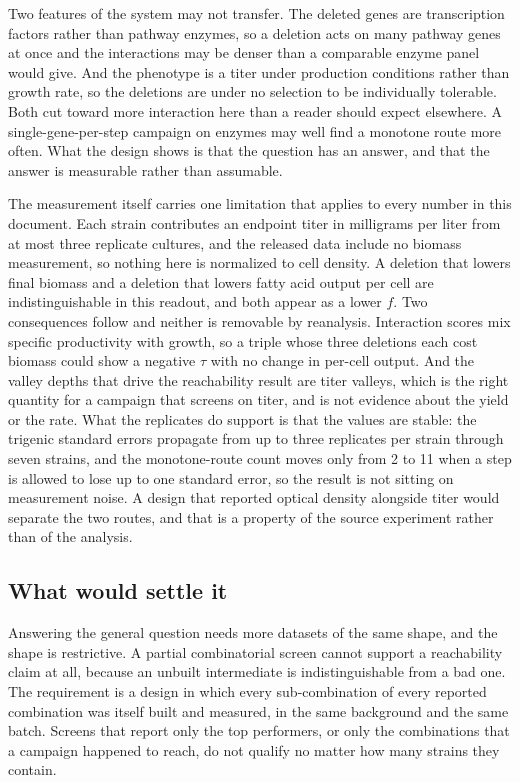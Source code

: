 Two features of the system may not transfer. The deleted genes are transcription factors
rather than pathway enzymes, so a deletion acts on many pathway genes at once and the
interactions may be denser than a comparable enzyme panel would give. And the phenotype is a
titer under production conditions rather than growth rate, so the deletions are under no
selection to be individually tolerable. Both cut toward more interaction here than a reader
should expect elsewhere. A single-gene-per-step campaign on enzymes may well find a monotone
route more often. What the design shows is that the question has an answer, and that the
answer is measurable rather than assumable.

The measurement itself carries one limitation that applies to every number in this
document. Each strain contributes an endpoint titer in milligrams per liter from at most
three replicate cultures, and the released data include no biomass measurement, so nothing here
is normalized to cell density. A deletion that lowers final biomass and a deletion that
lowers fatty acid output per cell are indistinguishable in this readout, and both appear as
a lower $f$. Two consequences follow and neither is removable by reanalysis. Interaction
scores mix specific productivity with growth, so a triple whose three deletions each cost
biomass could show a negative $\tau$ with no change in per-cell output. And the valley
depths that drive the reachability result are titer valleys, which is the right quantity
for a campaign that screens on titer, and is not evidence about the yield or the rate. What
the replicates do support is that the values are stable: the trigenic standard errors
propagate from up to three replicates per strain through seven strains, and the
monotone-route count moves only from 2 to 11 when a step is allowed to lose up to one standard error, so
the result is not sitting on measurement noise. A design that reported optical density
alongside titer would separate the two routes, and that is a property of the source
experiment rather than of the analysis.

\subsection*{What would settle it}

Answering the general question needs more datasets of the same shape, and the shape is
restrictive. A partial combinatorial screen cannot support a reachability claim at all,
because an unbuilt intermediate is indistinguishable from a bad one. The requirement is a
design in which every sub-combination of every reported combination was itself built and
measured, in the same background and the same batch. Screens that report only the top
performers, or only the combinations that a campaign happened to reach, do not qualify no
matter how many strains they contain.

